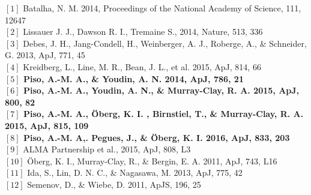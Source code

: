\documentclass[12pt, letterpaper]{article}
\begin{document}



%
\FloatBarrier

\footnotesize
\noindent $[1]$ Batalha, N. M. 2014, Proceedings of the National Academy of Science, 111, 12647 \\
$[2]$ Lissauer J. J., Dawson R. I., Tremaine S., 2014, Nature, 513, 336 \\
$[3]$ Debes, J. H., Jang-Condell, H., Weinberger, A. J., Roberge, A., \& Schneider, G. 2013, ApJ, 771, 45 \\
$[4]$ Kreidberg, L., Line, M. R., Bean, J. L., et al. 2015, ApJ, 814, 66 \\
\textbf{$[5]$ Piso, A.-M. A., \& Youdin, A. N. 2014, ApJ, 786, 21} \\
\textbf{$[6]$ Piso, A.-M. A., Youdin, A. N., \& Murray-Clay, R. A. 2015, ApJ, 800, 82} \\
\textbf{$[7]$ Piso, A.-M. A., \"Oberg, K. I. , Birnstiel, T., \& Murray-Clay, R. A. 2015, ApJ, 815, 109} \\
\textbf{$[8]$ Piso, A.-M. A,. Pegues, J., \& \"Oberg, K. I.  2016, ApJ, 833, 203} \\
$[9]$ ALMA Partnership et al., 2015, ApJ, 808, L3 \\
$[10]$ \"Oberg, K. I., Murray-Clay, R., \& Bergin, E. A. 2011, ApJ, 743, L16 \\
$[11]$ Ida, S., Lin, D. N. C., \& Nagasawa, M. 2013, ApJ, 775, 42 \\
$[12]$ Semenov, D., \& Wiebe, D. 2011, ApJS, 196, 25

%
%


\end{document}
